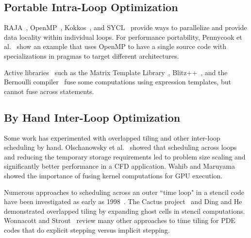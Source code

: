 \subsection{Portable Intra-Loop Optimization}
RAJA~\cite{RAJA}, OpenMP~\cite{OpenMPver5}, Kokkos~\cite{CarterEdwards2014},
and SYCL~\cite{SYCL2019} provide ways to parallelize and provide data locality
within individual loops.
For performance portability, Pennycook et al.~\cite{Pennycook2018} show an
example  that uses OpenMP to have a single source code with specializations
in pragmas to target different architectures.


Active libraries~\cite{VeldhuizenActive98} such as the 
Matrix Template Library~\cite{Siek:1999:SPM},
Blitz++~\cite{Veldhuizen2000},
and the Bernoulli compiler~\cite{Stodghill97,Ahmed2000} fuse some
computations using expression templates, but cannot fuse across statements.

\subsection{By Hand Inter-Loop Optimization}
Some work has experimented with overlapped tiling and other inter-loop
scheduling by hand.
Olschanowsky et al.~\cite{CathieSC14} showed that scheduling across loops and
reducing the temporary storage requirements led to problem size scaling and
significantly better performance in a CFD application.
Wahib and Maruyama~\cite{Wahib14} showed the importance of fusing kernel
computations for GPU execution.

Numerous approaches to scheduling across an outer ``time loop" in a stencil
code have been investigated as early as 1998~\cite{Bassetti98,Wonnacott00}.  
The Cactus project~\cite{Ripeanu2001,Allen00cactus-gtoolkit} and 
Ding and He~\cite{Ding2001} demonstrated  overlapped tiling by expanding
ghost cells in stencil computations. 
Wonnacott and Strout~\cite{Wonnacott13} review many other approaches to
time tiling for PDE codes that do explicit stepping versus implicit stepping.



